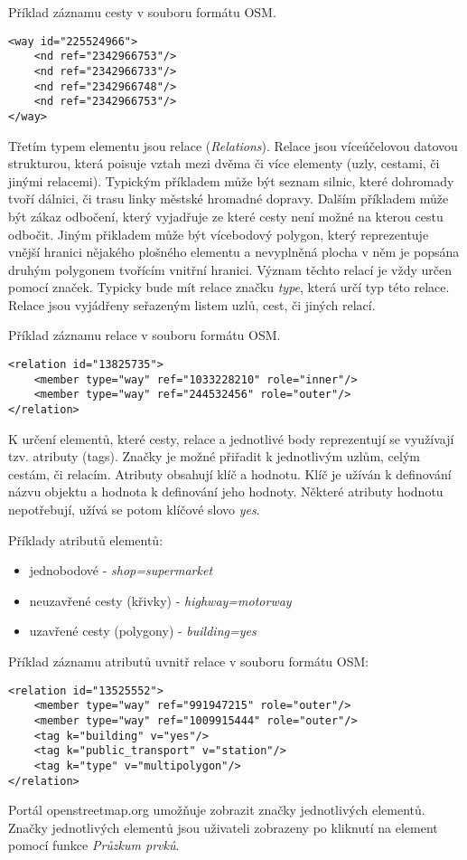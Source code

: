 Příklad záznamu cesty v souboru formátu OSM. 

\begin{lstlisting}
<way id="225524966">
    <nd ref="2342966753"/>
    <nd ref="2342966733"/>
    <nd ref="2342966748"/>
    <nd ref="2342966753"/>
</way>
\end{lstlisting}

Třetím typem elementu jsou relace (\textit{Relations}). Relace jsou víceúčelovou datovou strukturou, která poisuje vztah mezi dvěma či více elementy (uzly, cestami, či jinými relacemi). Typickým příkladem může být seznam silnic, které dohromady tvoří dálnici, či trasu linky městské hromadné dopravy. Dalším příkladem může být zákaz odbočení, který vyjadřuje ze které cesty není možné na kterou cestu odbočit. Jiným přikladem může být vícebodový polygon, který reprezentuje vnější hranici nějakého plošného elementu a nevyplněná plocha v něm je popsána druhým polygonem tvořícím vnitřní hranici. Význam těchto relací je vždy určen pomocí značek. Typicky bude mít relace značku \textit{type}, která určí typ této relace. Relace jsou vyjádřeny seřazeným listem uzlů, cest, či jiných relací. 

Příklad záznamu relace v souboru formátu OSM. 

\begin{lstlisting}
<relation id="13825735">
    <member type="way" ref="1033228210" role="inner"/>
    <member type="way" ref="244532456" role="outer"/>
</relation>
\end{lstlisting}

K určení elementů, které cesty, relace a jednotlivé body reprezentují se využívají tzv. atributy (tags). Značky je možné přiřadit k jednotlivým uzlům, celým cestám, či relacím. Atributy obsahují klíč a hodnotu. Klíč je užíván k definování názvu objektu a hodnota k definování jeho hodnoty. Některé atributy hodnotu nepotřebují, užívá se potom klíčové slovo \textit{yes}.

Příklady atributů elementů:

\begin{itemize}
  \item jednobodové - \textit{shop=supermarket}
  \item neuzavřené cesty (křivky) - \textit{highway=motorway}
  \item uzavřené cesty (polygony) - \textit{building=yes}
\end{itemize}

Příklad záznamu atributů uvnitř relace v souboru formátu OSM: 
\begin{lstlisting}
<relation id="13525552">
    <member type="way" ref="991947215" role="outer"/>
    <member type="way" ref="1009915444" role="outer"/>
    <tag k="building" v="yes"/>
    <tag k="public_transport" v="station"/>
    <tag k="type" v="multipolygon"/>
</relation>
\end{lstlisting}

Portál openstreetmap.org umožňuje zobrazit značky jednotlivých elementů. Značky jednotlivých elementů jsou uživateli zobrazeny po kliknutí na element pomocí funkce \textit{Průzkum prvků}. 

